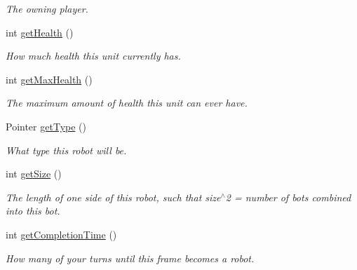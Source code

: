 \begin{DoxyCompactItemize}
\begin{DoxyCompactList}\small\item\em The owning player. \item\end{DoxyCompactList}\item 
\hypertarget{classFrame_abc3cc9a10ea4a7255469c58577fc96f7}{
int \hyperlink{classFrame_abc3cc9a10ea4a7255469c58577fc96f7}{getHealth} ()}
\label{classFrame_abc3cc9a10ea4a7255469c58577fc96f7}

\begin{DoxyCompactList}\small\item\em How much health this unit currently has. \item\end{DoxyCompactList}\item 
\hypertarget{classFrame_ad0927f019898a2c9ac8c393bf689c405}{
int \hyperlink{classFrame_ad0927f019898a2c9ac8c393bf689c405}{getMaxHealth} ()}
\label{classFrame_ad0927f019898a2c9ac8c393bf689c405}

\begin{DoxyCompactList}\small\item\em The maximum amount of health this unit can ever have. \item\end{DoxyCompactList}\item 
\hypertarget{classFrame_a9718321b001d44f30579872c89040235}{
Pointer \hyperlink{classFrame_a9718321b001d44f30579872c89040235}{getType} ()}
\label{classFrame_a9718321b001d44f30579872c89040235}

\begin{DoxyCompactList}\small\item\em What type this robot will be. \item\end{DoxyCompactList}\item 
\hypertarget{classFrame_a4bf9dbcceb0540169c97c13b16a3ba83}{
int \hyperlink{classFrame_a4bf9dbcceb0540169c97c13b16a3ba83}{getSize} ()}
\label{classFrame_a4bf9dbcceb0540169c97c13b16a3ba83}

\begin{DoxyCompactList}\small\item\em The length of one side of this robot, such that size$^\wedge$2 = number of bots combined into this bot. \item\end{DoxyCompactList}\item 
\hypertarget{classFrame_ae3b0d040c3bc3e056cfca17195103078}{
int \hyperlink{classFrame_ae3b0d040c3bc3e056cfca17195103078}{getCompletionTime} ()}
\label{classFrame_ae3b0d040c3bc3e056cfca17195103078}

\begin{DoxyCompactList}\small\item\em How many of your turns until this frame becomes a robot. \item\end{DoxyCompactList}\end{DoxyCompactItemize}
